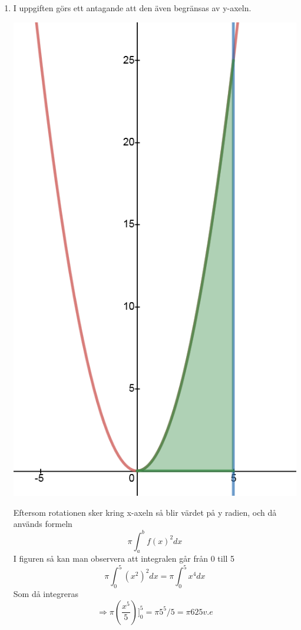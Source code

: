 \documentclass[a4paper,12pt]{article}
\begin{document}
\begin{enumerate}
    \item I uppgiften görs ett antagande att den även begränsas
    av y-axeln.

    \begin{center}
        \includegraphics[scale=0.4]{Figur 1.png}
    \end{center}

    Eftersom rotationen sker kring x-axeln så blir
    värdet på y radien, och då används formeln
    $$\pi\int_a^bf(x)^2dx$$
    I figuren så kan man observera att integralen går från 0 till 5
    $$\pi\int_0^5(x^2)^2dx=\pi\int_0^5x^4dx$$
    Som då integreras
    $$\Rightarrow \pi(\frac{x^5}{5})]^5_0=\pi 5^5/5=\pi 625 v.e$$


\end{enumerate}
\end{document}

